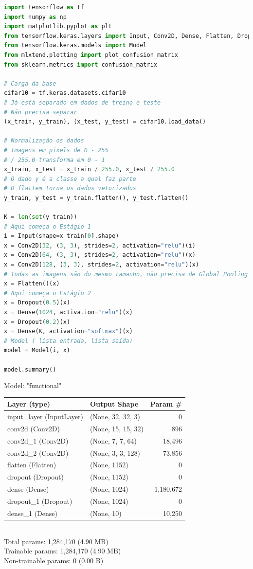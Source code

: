 \begin{lstlisting}[language=Python, style=input]
import tensorflow as tf
import numpy as np
import matplotlib.pyplot as plt
from tensorflow.keras.layers import Input, Conv2D, Dense, Flatten, Dropout
from tensorflow.keras.models import Model
from mlxtend.plotting import plot_confusion_matrix
from sklearn.metrics import confusion_matrix

# Carga da base
cifar10 = tf.keras.datasets.cifar10
# Já está separado em dados de treino e teste
# Não precisa separar
(x_train, y_train), (x_test, y_test) = cifar10.load_data()

# Normalização os dados
# Imagens em pixels de 0 - 255
# / 255.0 transforma em 0 - 1
x_train, x_test = x_train / 255.0, x_test / 255.0
# O dado y é a classe a qual faz parte
# O flattem torna os dados vetorizados
y_train, y_test = y_train.flatten(), y_test.flatten()

K = len(set(y_train))
# Aqui começa o Estágio 1
i = Input(shape=x_train[0].shape)
x = Conv2D(32, (3, 3), strides=2, activation="relu")(i)
x = Conv2D(64, (3, 3), strides=2, activation="relu")(x)
x = Conv2D(128, (3, 3), strides=2, activation="relu")(x)
# Todas as imagens são do mesmo tamanho, não precisa de Global Pooling
x = Flatten()(x)
# Aqui começa o Estágio 2
x = Dropout(0.5)(x)
x = Dense(1024, activation="relu")(x)
x = Dropout(0.2)(x)
x = Dense(K, activation="softmax")(x)
# Model ( lista entrada, lista saída)
model = Model(i, x)

model.summary()
\end{lstlisting}

\begin{tcolorbox}[myoutputstyle]
Model: "functional"\\

\begin{tabular}{|l|l|r|}
\hline
\textbf{Layer (type)} & \textbf{Output Shape} & \textbf{Param \#} \\ \hline
input\_layer (InputLayer) & (None, 32, 32, 3) & 0 \\ \hline
conv2d (Conv2D) & (None, 15, 15, 32) & 896 \\ \hline
conv2d\_1 (Conv2D) & (None, 7, 7, 64) & 18,496 \\ \hline
conv2d\_2 (Conv2D) & (None, 3, 3, 128) & 73,856 \\ \hline
flatten (Flatten) & (None, 1152) & 0 \\ \hline
dropout (Dropout) & (None, 1152) & 0 \\ \hline
dense (Dense) & (None, 1024) & 1,180,672 \\ \hline
dropout\_1 (Dropout) & (None, 1024) & 0 \\ \hline
dense\_1 (Dense) & (None, 10) & 10,250 \\ \hline
\end{tabular}\\

Total params: 1,284,170 (4.90 MB)\\
Trainable params: 1,284,170 (4.90 MB)\\
Non-trainable params: 0 (0.00 B)\\
\end{tcolorbox}



